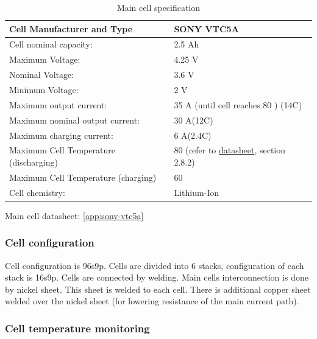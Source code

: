 \begin{table}[H]
	\centering
	\caption{Main cell specification}
	\begin{tabu}{|X|X|}
		\hline
		Cell Manufacturer and Type & SONY VTC5A \\
		\hline
		Cell nominal capacity: & 2.5 Ah \\
		\hline
		Maximum Voltage: & 4.25 V \\
		\hline
		Nominal Voltage: & 3.6 V \\
		\hline
		Minimum Voltage:  & 2 V \\
		\hline
		Maximum output current: & 35 A (until cell reaches 80 \degC) (14C)\\
		\hline
		Maximum nominal output current: & 30 A(12C) \\
		\hline
		Maximum charging current: & 6 A(2.4C) \\
		\hline
		Maximum Cell Temperature (discharging) & 80 \degC (refer to \hyperref[app:sony-vtc5a]{datasheet}, section 2.8.2) \\
		\hline
		Maximum Cell Temperature (charging) & 60 \degC \\
		\hline
		Cell chemistry: & Lithium-Ion \\
		\hline
	\end{tabu}%
	\label{tab:acc-cell}%
\end{table}%

Main cell datasheet: \ref{app:sony-vtc5a}

\subsubsection{Cell configuration}

Cell configuration is 96s9p. Cells are divided into 6 stacks, configuration of each stack is 16s9p. Cells are connected by welding. Main cells interconnection is done by nickel sheet. This sheet is welded to each cell. There is additional copper sheet welded over the nickel sheet (for lowering resistance of the main current path).

 
\subsubsection{Cell temperature monitoring}

